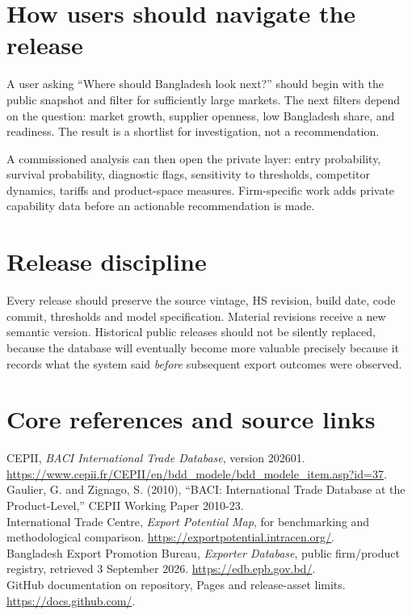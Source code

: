 \documentclass[11pt]{article}
\begin{document}
\section{How users should navigate the release}
A user asking ``Where should Bangladesh look next?'' should begin with the public snapshot and filter for sufficiently large markets. The next filters depend on the question: market growth, supplier openness, low Bangladesh share, and readiness. The result is a shortlist for investigation, not a recommendation.

A commissioned analysis can then open the private layer: entry probability, survival probability, diagnostic flags, sensitivity to thresholds, competitor dynamics, tariffs and product-space measures. Firm-specific work adds private capability data before an actionable recommendation is made.

\section{Release discipline}
Every release should preserve the source vintage, HS revision, build date, code commit, thresholds and model specification. Material revisions receive a new semantic version. Historical public releases should not be silently replaced, because the database will eventually become more valuable precisely because it records what the system said \emph{before} subsequent export outcomes were observed.

\section*{Core references and source links}
\small
CEPII, \emph{BACI International Trade Database}, version 202601. \url{https://www.cepii.fr/CEPII/en/bdd_modele/bdd_modele_item.asp?id=37}.\\
Gaulier, G. and Zignago, S. (2010), ``BACI: International Trade Database at the Product-Level,'' CEPII Working Paper 2010-23.\\
International Trade Centre, \emph{Export Potential Map}, for benchmarking and methodological comparison. \url{https://exportpotential.intracen.org/}.\\
Bangladesh Export Promotion Bureau, \emph{Exporter Database}, public firm/product registry, retrieved 3 September 2026. \url{https://edb.epb.gov.bd/}.\\
GitHub documentation on repository, Pages and release-asset limits. \url{https://docs.github.com/}.\\
\end{document}
